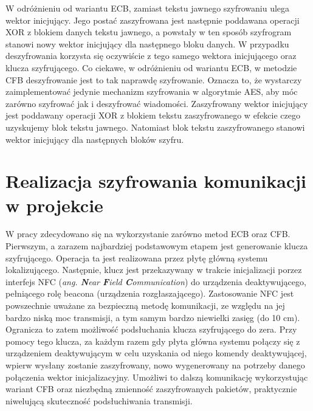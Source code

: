 W odróżnieniu od wariantu ECB, zamiast tekstu jawnego szyfrowaniu ulega wektor inicjujący. Jego postać zaszyfrowana jest następnie poddawana operacji XOR z blokiem danych tekstu jawnego, a powstały w ten sposób szyfrogram stanowi nowy wektor inicjujący dla następnego bloku danych.
W przypadku deszyfrowania korzysta się oczywiście z tego samego wektora inicjującego oraz klucza szyfrującego. Co ciekawe, w odróżnieniu od wariantu ECB, w metodzie CFB deszyfrowanie jest to tak naprawdę szyfrowanie. Oznacza to, że wystarczy zaimplementować jedynie mechanizm szyfrowania w algorytmie AES, aby móc zarówno szyfrować jak i deszyfrować wiadomości. Zaszyfrowany wektor inicjujący jest poddawany operacji XOR z blokiem tekstu zaszyfrowanego w efekcie czego uzyskujemy blok tekstu jawnego. Natomiast blok tekstu zaszyfrowanego stanowi wektor inicjujący dla następnych bloków szyfru.


\section{Realizacja szyfrowania komunikacji w projekcie}
W pracy zdecydowano się na wykorzystanie zarówno metod ECB oraz CFB. Pierwszym, a zarazem najbardziej podstawowym etapem jest generowanie klucza szyfrującego. Operacja ta jest realizowana przez płytę główną systemu lokalizującego. Następnie, klucz jest przekazywany w trakcie inicjalizacji porzez interfejs NFC (\textit{ang. \textbf{N}ear \textbf{F}ield \textbf{C}ommunication}) do urządzenia deaktywującego, pełniącego rolę beacona (urządzenia rozgłaszającego). Zastosowanie NFC jest powszechnie uważane za bezpieczną metodę komunikacji, ze względu na jej bardzo niską moc transmisji, a tym samym bardzo niewielki zasięg (do 10 cm). Ogranicza to zatem możliwość podsłuchania klucza szyfrującego do zera. Przy pomocy tego klucza, za każdym razem gdy płyta główna systemu połączy się z urządzeniem deaktywującym w celu uzyskania od niego komendy deaktywującej, wpierw wysłany zostanie zaszyfrowany, nowo wygenerowany na potrzeby danego połączenia wektor inicjalizacyjny. Umożliwi to dalszą komunikację wykorzystując wariant CFB oraz niezbędną zmienność zaszyfrowanych pakietów, praktycznie niwelującą skuteczność podsłuchiwania transmisji. 